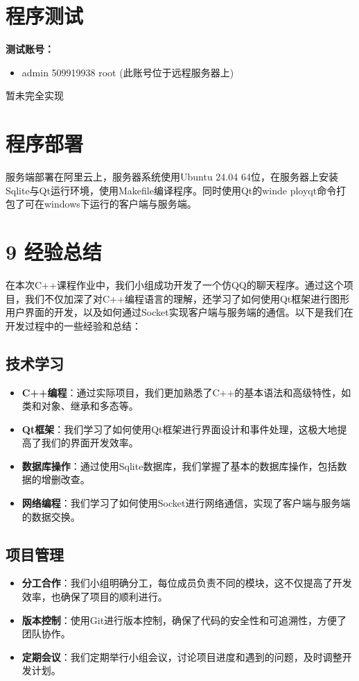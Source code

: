 \documentclass[UTF8]{ctexart}
\begin{document}
\section{程序测试}
\textbf{测试账号：}
\begin{itemize}
	\item admin 509919938 root (此账号位于远程服务器上)
\end{itemize}
暂未完全实现
\section{程序部署}
服务端部署在阿里云上，服务器系统使用Ubuntu 24.04 64位，在服务器上安装Sqlite与Qt运行环境，使用Makefile编译程序。同时使用Qt的winde
ployqt命令打包了可在windows下运行的客户端与服务端。
\section*{9 经验总结}

在本次C++课程作业中，我们小组成功开发了一个仿QQ的聊天程序。通过这个项目，我们不仅加深了对C++编程语言的理解，还学习了如何使用Qt框架进行图形用户界面的开发，以及如何通过Socket实现客户端与服务端的通信。以下是我们在开发过程中的一些经验和总结：

\subsection*{技术学习}

\begin{itemize}
	\item \textbf{C++编程}：通过实际项目，我们更加熟悉了C++的基本语法和高级特性，如类和对象、继承和多态等。
	\item \textbf{Qt框架}：我们学习了如何使用Qt框架进行界面设计和事件处理，这极大地提高了我们的界面开发效率。
	\item \textbf{数据库操作}：通过使用Sqlite数据库，我们掌握了基本的数据库操作，包括数据的增删改查。
	\item \textbf{网络编程}：我们学习了如何使用Socket进行网络通信，实现了客户端与服务端的数据交换。
\end{itemize}

\subsection*{项目管理}

\begin{itemize}
	\item \textbf{分工合作}：我们小组明确分工，每位成员负责不同的模块，这不仅提高了开发效率，也确保了项目的顺利进行。
	\item \textbf{版本控制}：使用Git进行版本控制，确保了代码的安全性和可追溯性，方便了团队协作。
	\item \textbf{定期会议}：我们定期举行小组会议，讨论项目进度和遇到的问题，及时调整开发计划。
\end{itemize}
\end{document}
